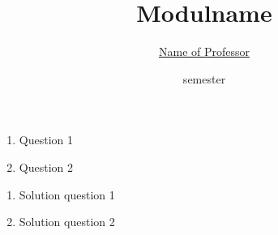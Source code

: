 


\title{Modulname}
\date{semester}
\author{\href{mailto:name@adress}{Name of Professor}}


\newcommand{\sheetnumber}{1}
\newcommand{\publishdate}{09.10.2019}
\newcommand{\handindate}{16.10.2019, 10:00 pm}
\setcounter{question}{0}




\begin{question}[subtitle={nice excercise}]
  \begin{enumerate}
    \item Question 1
    \item Question 2
  \end{enumerate}
\end{question}

\begin{qu-solution}
  \begin{enumerate}
    \item Solution question 1
    \item Solution question 2
  \end{enumerate}
\end{qu-solution}


